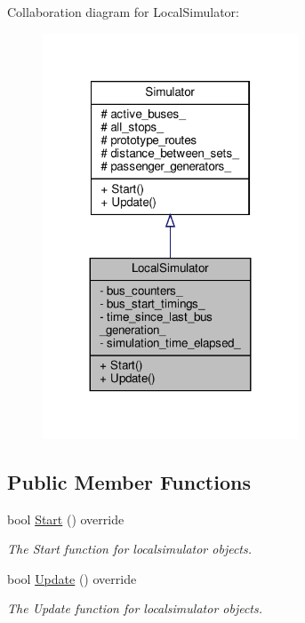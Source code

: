 Collaboration diagram for Local\+Simulator\+:\nopagebreak
\begin{figure}[H]
\begin{center}
\leavevmode
\includegraphics[width=215pt]{classLocalSimulator__coll__graph}
\end{center}
\end{figure}
\subsection*{Public Member Functions}
\begin{DoxyCompactItemize}
\item 
bool \hyperlink{classLocalSimulator_a380634942668855dd1da8276b270b362}{Start} () override
\begin{DoxyCompactList}\small\item\em The Start function for localsimulator objects. \end{DoxyCompactList}\item 
bool \hyperlink{classLocalSimulator_ac98ba1a401ad204dd5169934adb02684}{Update} () override
\begin{DoxyCompactList}\small\item\em The Update function for localsimulator objects. \end{DoxyCompactList}\end{DoxyCompactItemize}
